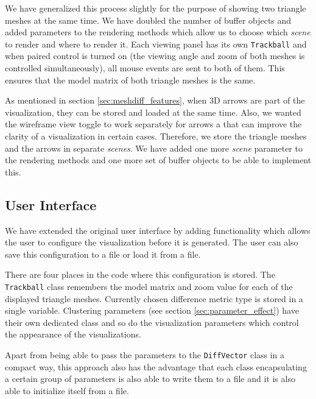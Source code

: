 We have generalized this process slightly for the purpose of showing two triangle meshes at the same time. We have doubled the number of buffer objects and added parameters to the rendering methods which allow us to choose which {\it scene} to render and where to render it. Each viewing panel has its own \verb+Trackball+ and when paired control is turned on (the viewing angle and zoom of both meshes is controlled simultaneously), all mouse events are sent to both of them. This ensures that the model matrix of both triangle meshes is the same.

As mentioned in section \ref{sec:meshdiff_features}, when 3D arrows are part of the visualization, they can be stored and loaded at the same time. Also, we wanted the wireframe view toggle to work separately for arrows a that can improve the clarity of a visualization in certain cases. Therefore, we store the triangle meshes and the arrows in separate {\it scenes}. We have added one more {\it scene} parameter to the rendering methods and one more set of buffer objects to be able to implement this.
\subsection{User Interface}

We have extended the original user interface by adding functionality which allows the user to configure the visualization before it is generated. The user can also save this configuration to a file or load it from a file.

There are four places in the code where this configuration is stored. The \verb+Trackball+ class remembers the model matrix and zoom value for each of the displayed triangle meshes. Currently chosen difference metric type is stored in a single variable. Clustering parameters (see section \ref{sec:parameter_effect}) have their own dedicated class and so do the visualization parameters which control the appearance of the visualizations.

Apart from being able to pass the parameters to the \verb+DiffVector+ class in a compact way, this approach also has the advantage that each class encapsulating a certain group of parameters is also able to write them to a file and it is also able to initialize itself from a file\footnotemark.


